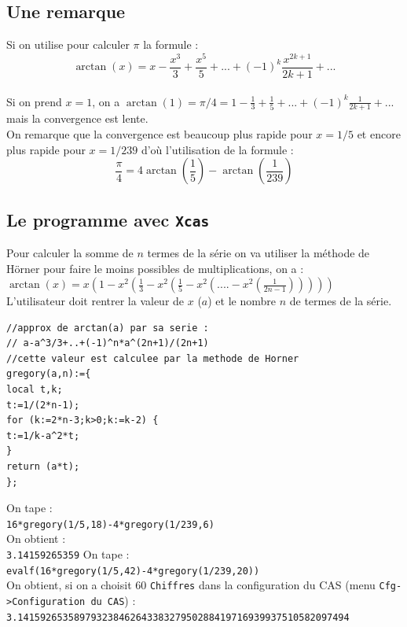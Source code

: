 \documentclass[a4paper,11pt]{book}
\begin{document}
\subsection{Une remarque}
Si on utilise pour calculer $\pi$ la formule :\\
$$\arctan(x)=x-\frac{x^3}{3}+\frac{x^5}{5}+...+(-1)^k\frac{x^{2k+1}}{2k+1}+...$$\\
Si on prend  $x=1$, on a $\arctan(1)=\pi/4=1-\frac{1}{3}+\frac{1}{5}+...+(-1)^k\frac{1}{2k+1}+...$ mais la convergence est lente.\\
On remarque que la convergence  est beaucoup plus rapide pour $x=1/5$
et encore plus rapide pour $x=1/239$ d'o\`u l'utilisation de la formule :\\
$$\frac{\pi}{4}=4\arctan(\frac{1}{5})-\arctan(\frac{1}{239})$$
\subsection{Le programme avec {\tt Xcas}}
Pour calculer la somme de $n$ termes de la s\'erie on va utiliser la m\'ethode 
de H\"orner pour faire le moins possibles de multiplications, on a :\\
$\arctan(x)=x(1-x^2(\frac{1}{3}-x^2(\frac{1}{5}-x^2(....-x^2(\frac{1}{2n-1})))))$ \\
L'utilisateur doit rentrer la valeur de $x$ ($a$) et le nombre $n$ de termes de 
la s\'erie. 
\begin{verbatim}
//approx de arctan(a) par sa serie :
// a-a^3/3+..+(-1)^n*a^(2n+1)/(2n+1) 
//cette valeur est calculee par la methode de Horner
gregory(a,n):={
local t,k;
t:=1/(2*n-1);
for (k:=2*n-3;k>0;k:=k-2) {
t:=1/k-a^2*t;
}
return (a*t);
};
\end{verbatim}
On tape :\\
{\tt 16*gregory(1/5,18)-4*gregory(1/239,6)}\\
On obtient :\\
{\tt 3.14159265359}
On tape :\\
{\tt evalf(16*gregory(1/5,42)-4*gregory(1/239,20))}\\
On obtient, si on a choisit 60 {\tt Chiffres} dans la configuration du CAS (menu
{\tt Cfg->Configuration du CAS}) :\\
{\tt 3.14159265358979323846264338327950288419716939937510582097494}
\end{document}

